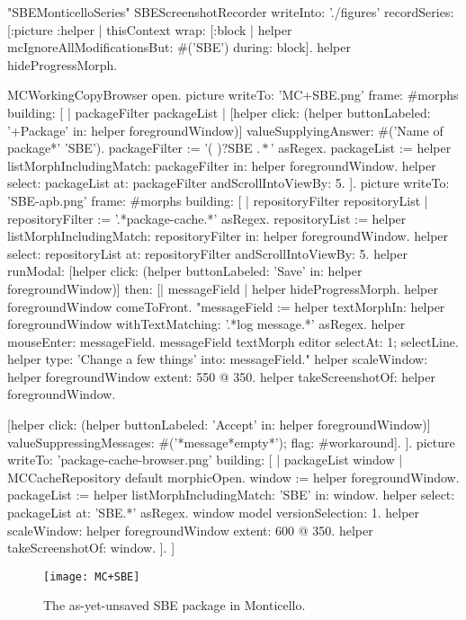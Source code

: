 \documentclass[a4paper,10pt,twoside]{book}
\begin{document}
\begin{ExecuteSmalltalkScript}
"SBEMonticelloSeries"
SBEScreenshotRecorder writeInto: './figures' recordSeries: [:picture :helper |
	thisContext wrap: [:block | helper mcIgnoreAllModificationsBut: #('SBE') during: block].
	helper hideProgressMorph.
	
	MCWorkingCopyBrowser open.
	picture writeTo: 'MC+SBE.png' frame: #morphs building: [
		| packageFilter packageList |
		[helper click: (helper buttonLabeled: '+Package' in: helper foregroundWindow)]
			valueSupplyingAnswer: #('Name of package*' 'SBE').
		packageFilter := '(\* )?SBE \(.*\)' asRegex.
		packageList := helper listMorphIncludingMatch: packageFilter in: helper foregroundWindow.
		helper select: packageList at: packageFilter andScrollIntoViewBy: 5.
	].
	picture writeTo: 'SBE-apb.png' frame: #morphs building: [
		| repositoryFilter repositoryList |
		repositoryFilter := '.*package-cache.*' asRegex.
		repositoryList := helper listMorphIncludingMatch: repositoryFilter in: helper foregroundWindow.
		helper select: repositoryList at: repositoryFilter andScrollIntoViewBy: 5.
		helper
			runModal: [helper click: (helper buttonLabeled: 'Save' in: helper foregroundWindow)]
			then: [| messageField |
				helper hideProgressMorph.
				helper foregroundWindow comeToFront.
				"messageField := helper textMorphIn: helper foregroundWindow withTextMatching: '.*log message.*' asRegex.
				helper mouseEnter: messageField.
				messageField textMorph editor selectAt: 1; selectLine.
				helper type: 'Change a few things' into: messageField."
				helper scaleWindow: helper foregroundWindow extent: 550 @ 350.
				helper takeScreenshotOf: helper foregroundWindow.
				
				[helper click: (helper buttonLabeled: 'Accept' in: helper foregroundWindow)]
					valueSuppressingMessages: #('*message*empty*');
					flag: #workaround].
	].
	picture writeTo: 'package-cache-browser.png' building: [
		| packageList window |
		MCCacheRepository default morphicOpen.
		window := helper foregroundWindow.
		packageList := helper listMorphIncludingMatch: 'SBE' in: window.
		helper select: packageList at: 'SBE.*' asRegex.
		window model versionSelection: 1.
		helper scaleWindow: helper foregroundWindow extent: 600 @ 350.
		helper takeScreenshotOf: window.
	].
]
\end{ExecuteSmalltalkScript}
\begin{figure}[tbp]
	\begin{center}
		\texttt{[image: MC+SBE]}
	\end{center}
	\caption{The as-yet-unsaved SBE package in Monticello.}
	\label{fig:MC+SBE}
\end{figure}
\end{document}
